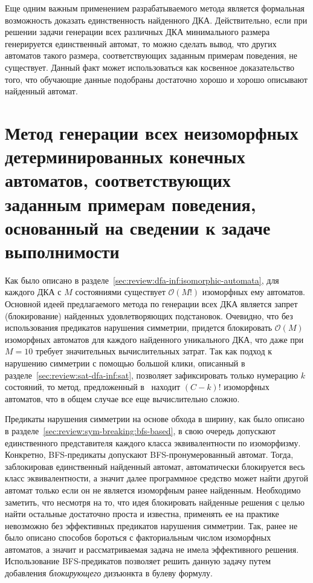 Еще одним важным применением разрабатываемого метода является формальная возможность доказать единственность найденного ДКА.
Действительно, если при решении задачи генерации всех различных ДКА минимального размера генерируется единственный автомат, то можно сделать вывод, что других автоматов такого размера, соответствующих заданным примерам поведения, не существует.
Данный факт может использоваться как косвенное доказательство того, что обучающие данные подобраны достаточно хорошо и хорошо описывают найденный автомат.


\section{Метод генерации всех неизоморфных детерминированных конечных автоматов, соответствующих заданным примерам поведения, основанный на сведении к задаче выполнимости}
\label{sec:findall:SAT-based}

Как было описано в разделе~\ref{sec:review:dfa-inf:isomorphic-automata}, для каждого ДКА с $M$ состояниями существует $\mathcal{O}\left(M!\right)$ изоморфных ему автоматов.
Основной идеей предлагаемого метода по генерации всех ДКА является запрет (блокирование) найденных удовлетворяющих подстановок.
Очевидно, что без использования предикатов нарушения симметрии, придется блокировать $\mathcal{O}\left(M\right)$ изоморфных автоматов для каждого найденного уникального ДКА, что даже при $M = 10$ требует значительных вычислительных затрат.
Так как подход к нарушению симметрии с помощью большой клики, описанный в разделе~\ref{sec:review:sat-dfa-inf:sat}, позволяет зафиксировать только нумерацию $k$ состояний, то метод, предложенный в~\cite{heule-icgi10} находит $\left(C - k\right)!$ изоморфных автоматов, что в общем случае все еще вычислительно сложно.

Предикаты нарушения симметрии на основе обхода в ширину, как было описано в разделе~\ref{sec:review:sym-breaking:bfs-based}, в свою очередь допускают единственного представителя каждого класса эквивалентности по изоморфизму.
Конкретно, BFS-предикаты допускают BFS-пронумерованный автомат.
Тогда, заблокировав единственный найденный автомат, автоматически блокируется весь класс эквивалентности, а значит далее программное средство может найти другой автомат только если он не является изоморфным ранее найденным.
Необходимо заметить, что несмотря на то, что идея блокировать найденные решения с целью найти остальные достаточно проста и известна, применять ее на практике невозможно без эффективных предикатов нарушения симметрии.
Так, ранее не было описано способов бороться с факториальным числом изоморфных автоматов, а значит и рассматриваемая задача не имела эффективного решения.
Использование BFS-предикатов позволяет решить данную задачу путем добавления \emph{блокирующего} дизъюнкта в булеву формулу. 

